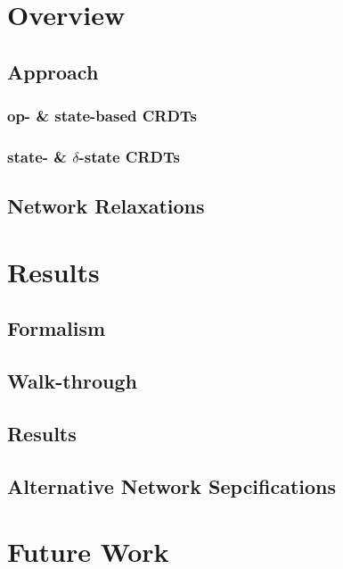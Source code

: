\documentclass{thesis}
\begin{document}
  \chapter{Overview}
  \section{Approach}
  \subsection{op- \& state-based CRDTs}
  \subsection{state- \& $\delta$-state CRDTs}
  \section{Network Relaxations}

  \chapter{Results}
  \section{Formalism}
  \section{Walk-through}
  \section{Results}
  \section{Alternative Network Sepcifications}

  \chapter{Future Work}

  \newpage
  
\end{document}
